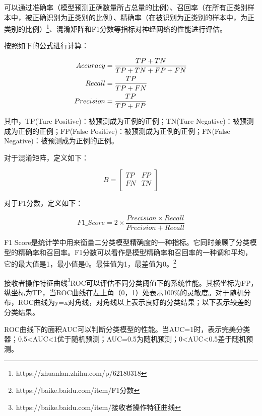 \documentclass{article}
\begin{document}
{	可以通过准确率（模型预测正确数量所占总量的比例）、召回率（在所有正类别样本中，被正确识别为正类别的比例）、精确率（在被识别为正类别的样本中，为正类别的比例）\footnote{https://zhuanlan.zhihu.com/p/62180318}、混淆矩阵和F1分数等指标对神经网络的性能进行评估。
	
	按照如下的公式进行计算：
	
	\begin{equation}
		\centering
		\begin{aligned}
			Accuracy &=\frac{TP+TN}{TP+TN+FP+FN} \\
			Recall &=\frac{TP}{TP+FN} \\
			Precision &=\frac{TP}{TP+FP} \\
		\end{aligned}
	\end{equation}

	其中，TP(Ture Positive)：被预测成为正例的正例；TN(Ture Negative)：被预测成为正例的正例；FP(False Positive)：被预测成为正例的正例；FN(False Negative)：被预测成为正例的正例。
	
	对于混淆矩阵，定义如下：
	
	\begin{equation}
		B = \begin{bmatrix}
			TP & FP \\
			FN & TN \\
		\end{bmatrix}	
	\end{equation}
	
	对于F1分数，定义如下：
	
	\begin{equation}
		F1\_Score = 2 \times \frac{Precision \times Recall}{Precision + Recall}
	\end{equation}
	
	F1 Score是统计学中用来衡量二分类模型精确度的一种指标。它同时兼顾了分类模型的精确率和召回率。F1分数可以看作是模型精确率和召回率的一种调和平均，它的最大值是1，最小值是0。最佳值为1，最差值为0。\footnote{https://baike.baidu.com/item/F1分数}
	
	接收者操作特征曲线\footnote{https://baike.baidu.com/item/接收者操作特征曲线}ROC可以评估不同分类阈值下的系统性能。其横坐标为FP，纵坐标为TP，当ROC曲线在左上角（0，1）处表示100\%的灵敏度。对于随机分布，ROC曲线为y=x对角线，对角线以上表示良好的分类结果；以下表示较差的分类结果。
	
	ROC曲线下的面积AUC可以判断分类模型的性能。当AUC=1时，表示完美分类器；0.5<AUC<1优于随机预测；AUC=0.5为随机预测；0<AUC<0.5差于随机预测。
	
}
\end{document}

